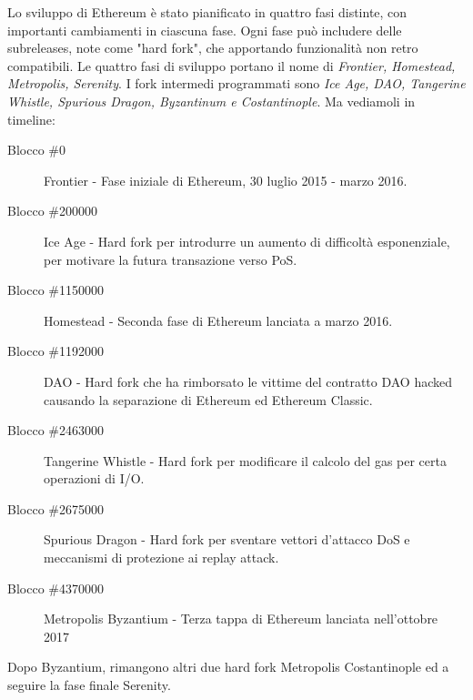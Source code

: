 Lo sviluppo di Ethereum è stato pianificato in quattro fasi distinte, con importanti cambiamenti in ciascuna fase. Ogni fase può includere delle subreleases, note come "hard fork", che apportando funzionalità non retro compatibili. Le quattro fasi di sviluppo portano il nome di \textit{Frontier, Homestead, Metropolis, Serenity}. I fork intermedi programmati sono \textit{Ice Age, DAO, Tangerine Whistle, Spurious Dragon, Byzantinum e Costantinople}. Ma vediamoli in timeline:
\begin{description}
	\item[Blocco \#0] Frontier - Fase iniziale di Ethereum, 30 luglio 2015 - marzo 2016.
	\item[Blocco \#200000] Ice Age - Hard fork per introdurre un aumento di difficoltà esponenziale, per motivare la futura transazione verso PoS.
	\item[Blocco \#1150000] Homestead - Seconda fase di Ethereum lanciata a marzo 2016.
	\item[Blocco \#1192000] DAO - Hard fork che ha rimborsato le vittime del contratto DAO hacked causando la separazione di Ethereum ed Ethereum Classic.
	\item[Blocco \#2463000] Tangerine Whistle - Hard fork per modificare il calcolo del gas per certa operazioni di I/O.
	\item[Blocco \#2675000] Spurious Dragon - Hard fork per sventare vettori d'attacco DoS e meccanismi di protezione ai replay attack.
	\item[Blocco \#4370000] Metropolis Byzantium - Terza tappa di Ethereum lanciata nell'ottobre 2017
\end{description}
Dopo Byzantium, rimangono altri due hard fork Metropolis Costantinople ed a seguire la fase finale Serenity.

